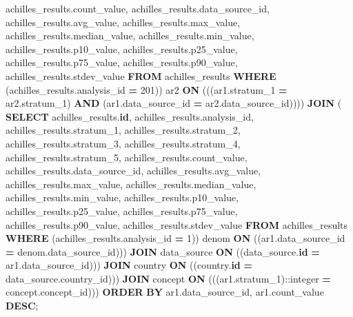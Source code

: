 \documentclass[
]{book}
\newenvironment{Shaded}{\begin{snugshade}}{\end{snugshade}}
\newcommand{\CharTok}[1]{\textcolor[rgb]{0.31,0.60,0.02}{#1}}
\newcommand{\DecValTok}[1]{\textcolor[rgb]{0.00,0.00,0.81}{#1}}
\newcommand{\KeywordTok}[1]{\textcolor[rgb]{0.13,0.29,0.53}{\textbf{#1}}}
\newcommand{\NormalTok}[1]{#1}
\newcommand{\OperatorTok}[1]{\textcolor[rgb]{0.81,0.36,0.00}{\textbf{#1}}}
\begin{document}
\begin{Shaded}
\begin{Highlighting}[]
\NormalTok{           achilles\_results.count\_value,}
\NormalTok{           achilles\_results.data\_source\_id,}
\NormalTok{           achilles\_results.avg\_value,}
\NormalTok{           achilles\_results.max\_value,}
\NormalTok{           achilles\_results.median\_value,}
\NormalTok{           achilles\_results.min\_value,}
\NormalTok{           achilles\_results.p10\_value,}
\NormalTok{           achilles\_results.p25\_value,}
\NormalTok{           achilles\_results.p75\_value,}
\NormalTok{           achilles\_results.p90\_value,}
\NormalTok{           achilles\_results.stdev\_value}
          \KeywordTok{FROM}\NormalTok{ achilles\_results}
         \KeywordTok{WHERE}\NormalTok{ (achilles\_results.analysis\_id }\OperatorTok{=} \DecValTok{201}\NormalTok{)) ar2 }\KeywordTok{ON}\NormalTok{ (((ar1.stratum\_1 }\OperatorTok{=}\NormalTok{ ar2.stratum\_1) }\KeywordTok{AND}\NormalTok{ (ar1.data\_source\_id }\OperatorTok{=}\NormalTok{ ar2.data\_source\_id))))}
    \KeywordTok{JOIN}\NormalTok{ ( }\KeywordTok{SELECT}\NormalTok{ achilles\_results.}\KeywordTok{id}\NormalTok{,}
\NormalTok{           achilles\_results.analysis\_id,}
\NormalTok{           achilles\_results.stratum\_1,}
\NormalTok{           achilles\_results.stratum\_2,}
\NormalTok{           achilles\_results.stratum\_3,}
\NormalTok{           achilles\_results.stratum\_4,}
\NormalTok{           achilles\_results.stratum\_5,}
\NormalTok{           achilles\_results.count\_value,}
\NormalTok{           achilles\_results.data\_source\_id,}
\NormalTok{           achilles\_results.avg\_value,}
\NormalTok{           achilles\_results.max\_value,}
\NormalTok{           achilles\_results.median\_value,}
\NormalTok{           achilles\_results.min\_value,}
\NormalTok{           achilles\_results.p10\_value,}
\NormalTok{           achilles\_results.p25\_value,}
\NormalTok{           achilles\_results.p75\_value,}
\NormalTok{           achilles\_results.p90\_value,}
\NormalTok{           achilles\_results.stdev\_value}
          \KeywordTok{FROM}\NormalTok{ achilles\_results}
         \KeywordTok{WHERE}\NormalTok{ (achilles\_results.analysis\_id }\OperatorTok{=} \DecValTok{1}\NormalTok{)) denom }\KeywordTok{ON}\NormalTok{ ((ar1.data\_source\_id }\OperatorTok{=}\NormalTok{ denom.data\_source\_id)))}
    \KeywordTok{JOIN}\NormalTok{ data\_source }\KeywordTok{ON}\NormalTok{ ((data\_source.}\KeywordTok{id} \OperatorTok{=}\NormalTok{ ar1.data\_source\_id)))}
    \KeywordTok{JOIN}\NormalTok{ country }\KeywordTok{ON}\NormalTok{ ((country.}\KeywordTok{id} \OperatorTok{=}\NormalTok{ data\_source.country\_id)))}
    \KeywordTok{JOIN}\NormalTok{ concept }\KeywordTok{ON}\NormalTok{ (((ar1.stratum\_1):}\CharTok{:integer} \OperatorTok{=}\NormalTok{ concept.concept\_id)))}
 \KeywordTok{ORDER} \KeywordTok{BY}\NormalTok{ ar1.data\_source\_id, ar1.count\_value }\KeywordTok{DESC}\NormalTok{;}
\end{Highlighting}
\end{Shaded}
\end{document}
